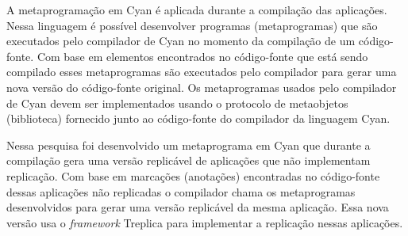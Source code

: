 \documentclass[12pt]{article}
\begin{document}
A metaprogramação em Cyan é aplicada durante a compilação das aplicações. Nessa 
linguagem é possível desenvolver programas (metaprogramas) que são executados pelo 
compilador de Cyan no momento da compilação de um código-fonte. Com base em 
elementos encontrados no código-fonte que está sendo compilado esses 
metaprogramas são executados pelo compilador para gerar uma nova versão do 
código-fonte original. Os metaprogramas 
usados pelo compilador de Cyan devem ser implementados usando o protocolo 
de metaobjetos (biblioteca) fornecido junto ao código-fonte do compilador 
da linguagem Cyan.

Nessa pesquisa foi desenvolvido um metaprograma em Cyan que durante a compilação
gera uma versão replicável de aplicações que não implementam replicação.
Com base em marcações (anotações) encontradas no código-fonte dessas aplicações 
não replicadas o compilador chama os metaprogramas desenvolvidos para
gerar uma versão replicável da mesma aplicação. Essa nova versão usa o 
\textit{framework} Treplica para implementar a replicação nessas aplicações.
\end{document}

